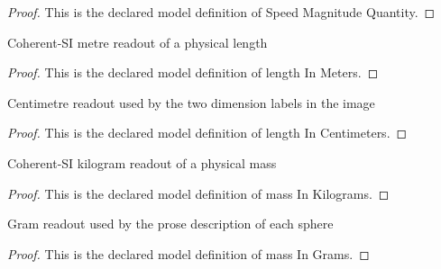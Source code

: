 \begin{proof}
  This is the declared model definition of Speed Magnitude Quantity.
\end{proof}
\begin{definition}
  \label{def:physics:phyx-mini-0864:phyxminiproblems-problemphyxmini0864-lengthinmeters}
  Coherent-SI metre readout of a physical length
\end{definition}
\begin{proof}
  This is the declared model definition of length In Meters.
\end{proof}
\begin{definition}
  \label{def:physics:phyx-mini-0864:phyxminiproblems-problemphyxmini0864-lengthincentimeters}
  Centimetre readout used by the two dimension labels in the image
\end{definition}
\begin{proof}
  This is the declared model definition of length In Centimeters.
\end{proof}
\begin{definition}
  \label{def:physics:phyx-mini-0864:phyxminiproblems-problemphyxmini0864-massinkilograms}
  Coherent-SI kilogram readout of a physical mass
\end{definition}
\begin{proof}
  This is the declared model definition of mass In Kilograms.
\end{proof}
\begin{definition}
  \label{def:physics:phyx-mini-0864:phyxminiproblems-problemphyxmini0864-massingrams}
  Gram readout used by the prose description of each sphere
\end{definition}
\begin{proof}
  This is the declared model definition of mass In Grams.
\end{proof}
